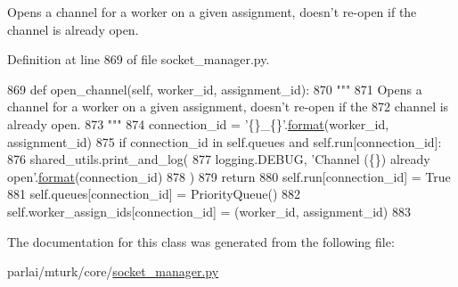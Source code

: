 \begin{DoxyVerb}Opens a channel for a worker on a given assignment, doesn't re-open if the
channel is already open.
\end{DoxyVerb}
 

Definition at line 869 of file socket\+\_\+manager.\+py.


\begin{DoxyCode}
869     \textcolor{keyword}{def }open\_channel(self, worker\_id, assignment\_id):
870         \textcolor{stringliteral}{"""}
871 \textcolor{stringliteral}{        Opens a channel for a worker on a given assignment, doesn't re-open if the}
872 \textcolor{stringliteral}{        channel is already open.}
873 \textcolor{stringliteral}{        """}
874         connection\_id = \textcolor{stringliteral}{'\{\}\_\{\}'}.\hyperlink{namespaceparlai_1_1chat__service_1_1services_1_1messenger_1_1shared__utils_a32e2e2022b824fbaf80c747160b52a76}{format}(worker\_id, assignment\_id)
875         \textcolor{keywordflow}{if} connection\_id \textcolor{keywordflow}{in} self.queues \textcolor{keywordflow}{and} self.run[connection\_id]:
876             shared\_utils.print\_and\_log(
877                 logging.DEBUG, \textcolor{stringliteral}{'Channel (\{\}) already open'}.\hyperlink{namespaceparlai_1_1chat__service_1_1services_1_1messenger_1_1shared__utils_a32e2e2022b824fbaf80c747160b52a76}{format}(connection\_id)
878             )
879             \textcolor{keywordflow}{return}
880         self.run[connection\_id] = \textcolor{keyword}{True}
881         self.queues[connection\_id] = PriorityQueue()
882         self.worker\_assign\_ids[connection\_id] = (worker\_id, assignment\_id)
883 \end{DoxyCode}


The documentation for this class was generated from the following file\+:\begin{DoxyCompactItemize}
\item 
parlai/mturk/core/\hyperlink{socket__manager_8py}{socket\+\_\+manager.\+py}\end{DoxyCompactItemize}
